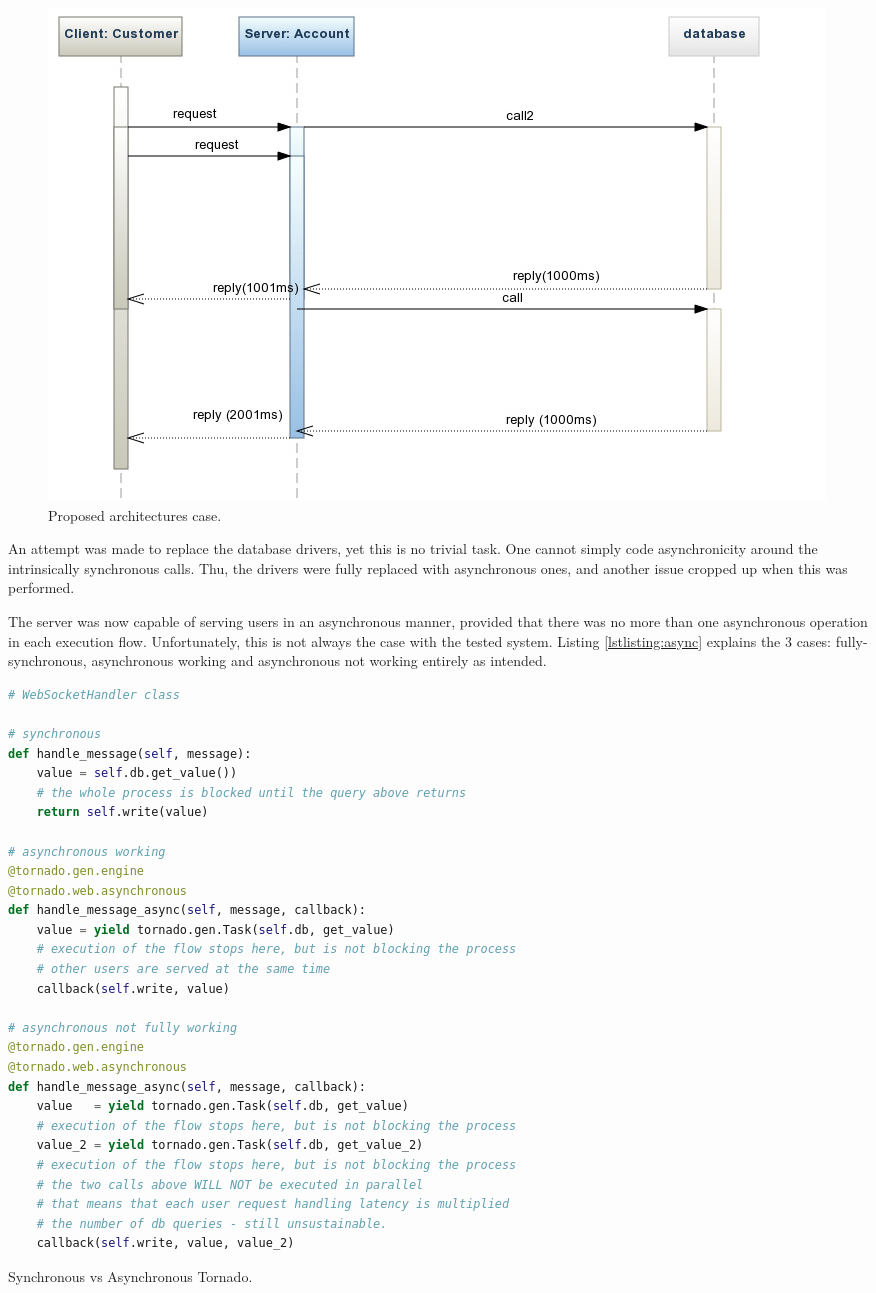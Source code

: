 \documentclass{uvamscse}
\begin{document}
\begin{figure}[H]
\centering
\includegraphics[scale=0.5]{case2}
\caption{Proposed architectures case.}
\label{figure:case2}
\end{figure}
An attempt was made to replace the database drivers, yet this is no trivial task. One cannot simply code asynchronicity around the intrinsically synchronous calls. Thu, the drivers were fully replaced with asynchronous ones, and another issue cropped up when this was performed.

The server was now capable of serving users in an asynchronous manner, provided that there was no more than one asynchronous operation in each execution flow. Unfortunately, this is not always the case with the tested system. Listing \ref{lstlisting:async} explains the 3 cases: fully-synchronous, asynchronous working and asynchronous not working entirely as intended.

\begin{sourcecode}[H]
\begin{lstlisting}[style=mono, language=Python]
# WebSocketHandler class

# synchronous
def handle_message(self, message):
    value = self.db.get_value())
    # the whole process is blocked until the query above returns
    return self.write(value)

# asynchronous working
@tornado.gen.engine
@tornado.web.asynchronous
def handle_message_async(self, message, callback):
    value = yield tornado.gen.Task(self.db, get_value)
    # execution of the flow stops here, but is not blocking the process
    # other users are served at the same time
    callback(self.write, value)

# asynchronous not fully working
@tornado.gen.engine
@tornado.web.asynchronous
def handle_message_async(self, message, callback):
    value   = yield tornado.gen.Task(self.db, get_value)
    # execution of the flow stops here, but is not blocking the process
    value_2 = yield tornado.gen.Task(self.db, get_value_2)
    # execution of the flow stops here, but is not blocking the process
    # the two calls above WILL NOT be executed in parallel
    # that means that each user request handling latency is multiplied
    # the number of db queries - still unsustainable.
    callback(self.write, value, value_2)
\end{lstlisting}
\caption{Synchronous vs Asynchronous Tornado.}
\label{lstlisting:async}
\end{sourcecode}
\end{document}
